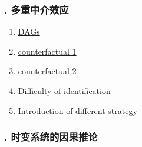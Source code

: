 \documentclass[11pt]{article}
\begin{document}
\vspace{-1cm}

\subsubsection*{. 多重中介效应}

\vspace{-0.5cm}

\begin{multicols}{2}
	\begin{enumerate}
		\item \href{https://mp.weixin.qq.com/s/6-TvJrRUcluUYCzGwgluKA}{DAGs}	%
		\item \href{https://mp.weixin.qq.com/s/RMfV5z9WIxsswops8HLKng}{counterfactual 1}	%
		\item \href{https://mp.weixin.qq.com/s/EKEqsaAx_RmQDJlFy9vsmw}{counterfactual 2}	%
		\item \href{https://mp.weixin.qq.com/s/5k5HY6pT6tnrAW4gFVRVKw}{Difficulty of identification}	%
		\item \href{https://mp.weixin.qq.com/s/n-mpLQk9pysPWUrSz26TVg}{Introduction of different strategy}	%
	\end{enumerate}
\end{multicols}



\vspace{-1cm}

\subsubsection*{. 时变系统的因果推论}

\vspace{-0.5cm}
\end{document}
